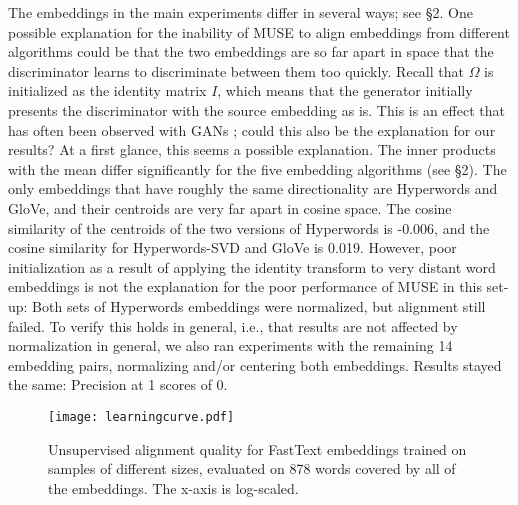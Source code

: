 \documentclass[11pt,a4paper]{article}
\begin{document}
The embeddings in the main experiments differ in several ways; see \S2. One possible explanation for the inability of MUSE to align embeddings from different algorithms could be that the two embeddings are so far apart in space that the discriminator learns to discriminate between them too quickly. Recall that $\Omega$ is initialized as the identity matrix $I$, which means that the generator initially presents the discriminator with the source embedding as is. This is an effect that has often been observed with GANs \cite{Arjovsky:Bottou:17}; could this also be the explanation for our results? At a first glance, this seems a possible explanation. The inner products with the mean differ significantly for the five embedding algorithms (see \S2). The only embeddings that have roughly the same directionality are Hyperwords and GloVe, and their centroids are very far apart in cosine space. The cosine similarity of the centroids of the two versions of Hyperwords is -0.006, and the cosine similarity for Hyperwords-SVD and GloVe is 0.019. 
However, poor initialization as a result of applying the identity transform to very distant word embeddings is not the explanation for the poor performance of MUSE in this set-up: Both sets of Hyperwords embeddings were normalized, but alignment still failed. To verify this holds in general, i.e., that results are not affected by normalization in general, we also ran experiments with the remaining 14 embedding pairs, normalizing and/or centering both embeddings. Results stayed the same: Precision at 1 scores of 0.

\begin{figure}
\texttt{[image: learningcurve.pdf]}
\caption{Unsupervised alignment quality for FastText embeddings trained on samples of different sizes, evaluated on 878 words covered by all of the embeddings. The x-axis is log-scaled.}\label{f:learningcurve}
\end{figure}
\end{document}
